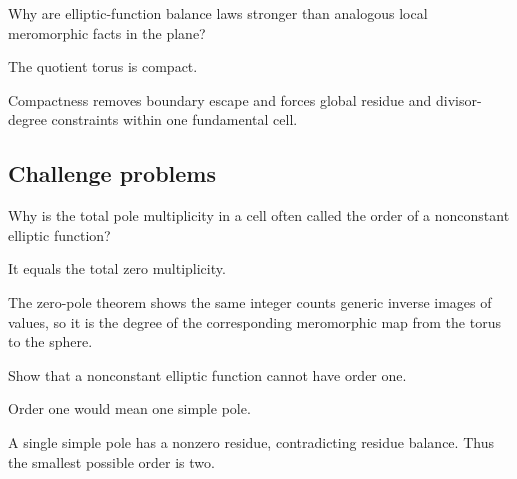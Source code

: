 \begin{exercise}\label{exr:iv28-expand-14}
Why are elliptic-function balance laws stronger than analogous local meromorphic facts in the plane?
\end{exercise}
\begin{hint}
The quotient torus is compact.
\end{hint}
\begin{solution}
Compactness removes boundary escape and forces global residue and divisor-degree constraints within one fundamental cell.
\end{solution}

\subsection*{Challenge problems}

\begin{exercise}\label{exr:iv28-expand-15}
Why is the total pole multiplicity in a cell often called the order of a nonconstant elliptic function?
\end{exercise}
\begin{hint}
It equals the total zero multiplicity.
\end{hint}
\begin{solution}
The zero-pole theorem shows the same integer counts generic inverse images of values, so it is the degree of the corresponding meromorphic map from the torus to the sphere.
\end{solution}

\begin{exercise}\label{exr:iv28-expand-16}
Show that a nonconstant elliptic function cannot have order one.
\end{exercise}
\begin{hint}
Order one would mean one simple pole.
\end{hint}
\begin{solution}
A single simple pole has a nonzero residue, contradicting residue balance. Thus the smallest possible order is two.
\end{solution}

